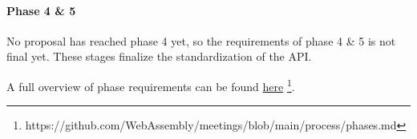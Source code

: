 \paragraph{Phase 4 \& 5}

No proposal has reached phase 4 yet, so the requirements of phase 4 \& 5 is not final yet. These stages finalize the standardization of the API.


A full overview of phase requirements can be found \href{https://github.com/WebAssembly/meetings/blob/main/process/phases.md}{here} \footnote{https://github.com/WebAssembly/meetings/blob/main/process/phases.md}.


